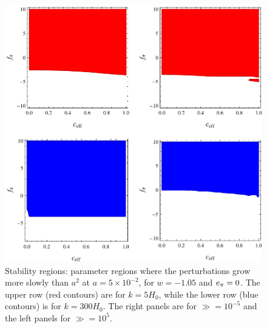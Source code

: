 \begin{figure}[tb]
\centering 
\includegraphics[width=\textwidth]{figures/chapter-ade/stability2.pdf} 
\caption{Stability regions: parameter regions where the perturbations grow more slowly than $a^2$ at $a=5\times10^{-2}$, for $w=-1.05$ and $\aa=0$. The upper row (red contours) are for $k=5 H_0$, while the lower row (blue contours) is for $k=300 H_0$. The right panels are for $ \gg = 10^{-5} $ and the left panels for $ \gg=10^5 $.}
\label{fig:stability:2}
\end{figure} 
